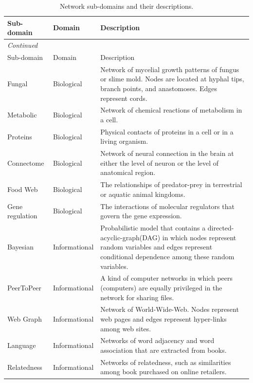 \documentclass{article}
\begin{document}
\newpage
	\begin{longtable}{| l | l | p{9cm} |}
	\caption{Network sub-domains and their descriptions.} \label{tab:subdomain}\\
	
	\hline
 	Sub-domain & Domain& Description \\ \hline \hline
	 \endfirsthead
	 \multicolumn{3}{l}{\small\it Continued}\\ \hline
	 Sub-domain & Domain& Description \\ \hline \hline
 	\endhead
      Fungal &  Biological & Network of mycelial growth patterns of fungus or slime mold. Nodes are located at hyphal tips, branch points, and anastomoses. Edges represent cords.\\  %
      Metabolic &  Biological & Network of chemical reactions of metabolism in a cell.\\  %
      Proteins &  Biological & Physical contacts of proteins in a cell or in a living organism.\\  %
      Connectome &  Biological & Network of neural connection in the brain at either the level of neuron or the level of anatomical region.\\  %
      Food Web &  Biological & The relationships of predator-prey in terrestrial or aquatic animal kingdoms.\\  %
      Gene regulation &  Biological & The interactions of molecular regulators that govern the gene expression.\\ %
      Bayesian & Informational & Probabilistic model that contains a directed-acyclic-graph(DAG) in which nodes represent random variables and edges represent conditional dependence among these random variables.\\  %
      PeerToPeer &  Informational & A kind of computer networks in which peers (computers) are equally privileged in the network for sharing files.\\ %
      Web Graph &  Informational & Network of World-Wide-Web. Nodes represent web pages and edges represent hyper-links among web sites. \\  %
      Language &  Informational & Networks of word adjacency and word association that are extracted from books.\\  %
      Relatedness &  Informational & Networks of relatedness, such as similarities among book purchased on online retailers. \\ %

\end{longtable}
\end{document}
